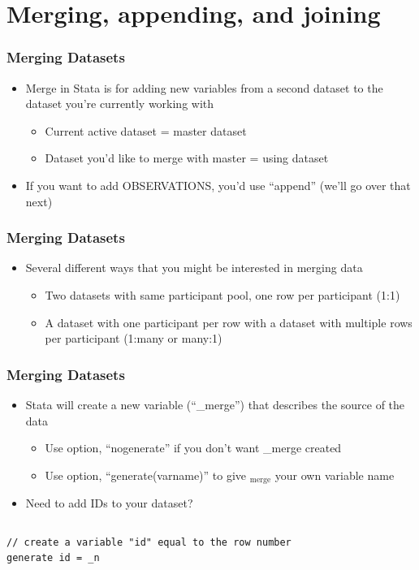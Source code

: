 \documentclass[table]{beamer}
\begin{document}
\section{Merging, appending, and joining}
\label{sec-6}
\begin{frame}
\frametitle{Merging Datasets}
\label{sec-6-1}

\begin{itemize}
\item Merge in Stata is for adding new variables
  from a second dataset to the dataset you're
  currently working with
\begin{itemize}
\item Current active dataset = master dataset
\item Dataset you'd like to merge with master = using
     dataset
\end{itemize}
\item If you want to add OBSERVATIONS, you'd use
  ``append'' (we'll go over that next)
\end{itemize}
\end{frame}
\begin{frame}
\frametitle{Merging Datasets}
\label{sec-6-2}

\begin{itemize}
\item Several different ways that you might be
  interested in merging data
\begin{itemize}
\item Two datasets with same participant pool, one row
     per participant (1:1)
\item A dataset with one participant per row with a
     dataset with multiple rows per participant
     (1:many or many:1)
\end{itemize}
\end{itemize}
\end{frame}
\begin{frame}[fragile]
\frametitle{Merging Datasets}
\label{sec-6-3}

\begin{itemize}
\item Stata will create a new variable (``\_merge'')
  that describes the source of the data
\begin{itemize}
\item Use option, ``nogenerate'' if you don't want
     \_merge created
\item Use option, ``generate(varname)'' to give $_{\mathrm{merge}}$
     your own variable name
\end{itemize}
\item Need to add IDs to your dataset?
\end{itemize}

\vspace{-.5em} \begin{columns}  \begin{block}{}

\begin{verbatim}
// create a variable "id" equal to the row number 
generate id = _n
\end{verbatim}
\end{block} \end{columns}
\end{frame}
\end{document}
